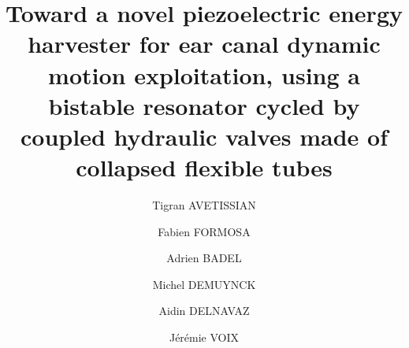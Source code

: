 \documentclass[3p,twocolumn,preprint]{elsarticle}
\begin{document}
\tableofcontents

\begin{frontmatter}



\title{Toward a novel piezoelectric energy harvester for ear canal dynamic motion exploitation, using a bistable resonator cycled by coupled hydraulic valves made of collapsed flexible tubes}



\address[symme]{Laboratoire SYMME - Université Savoie Mont Blanc, 7 Chemin de Bellevue, 74940, Annecy}
\address[critias]{Université du Québec - École de technologie supérieure, 1100 Rue Notre-Dame Ouest, Montréal, QC, H3C 1K3}


\author[symme]{Tigran AVETISSIAN}
\author[symme]{Fabien FORMOSA}
\author[symme]{Adrien BADEL}

\author[critias]{Michel DEMUYNCK}
\author[critias]{Aidin DELNAVAZ}
\author[critias]{Jérémie VOIX}



\end{frontmatter}
\end{document}
